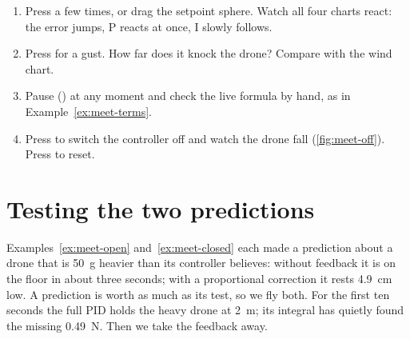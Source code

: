 
\begin{trythis}
\begin{enumerate}
  \item Press  a few times, or drag the setpoint sphere. Watch all four charts react: the error jumps, P reacts at once, I slowly follows.
  \item Press  for a gust. How far does it knock the drone? Compare with the wind chart.
  \item Pause () at any moment and check the live formula by hand, as in Example~\ref{ex:meet-terms}.
  \item Press  to switch the controller off and watch the drone fall (\cref{fig:meet-off}). Press  to reset.
\end{enumerate}
\end{trythis}

\section{Testing the two predictions}

%
Examples~\ref{ex:meet-open} and~\ref{ex:meet-closed} each made a prediction about a drone that is \SI{50}{g} heavier than its controller believes: without feedback it is on the floor in about three seconds; with a proportional correction it rests \SI{4.9}{cm} low. A prediction is worth as much as its test, so we fly both. For the first ten seconds the full PID holds the heavy drone at \SI{2}{m}; its integral has quietly found the missing \SI{0.49}{N}. Then we take the feedback away.


